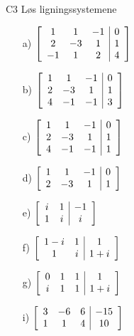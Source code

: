 \documentclass[a4paper,norsk,11pt]{interaktiv}
\newenvironment{amatrix}[1]{%
  \left[\begin{array}{*{#1}{c}|c}
}{%
  \end{array}\right]
}
\begin{document}
\begin{oppgave}{C3}
Løs ligningssystemene

\begin{itemize}
\item[a)]
$
\begin{amatrix}{3}
1 & 1 & -1 & 0 \\
  2 &- 3 & 1 & 1  \\
 -1 &  1 & 2 &  4
\end{amatrix}
$
\item[b)]
$
\begin{amatrix}{3}
  1 & 1 & -1 & 0 \\
 2 & - 3 & 1 & 1\\
 4 & -1 & -1 & 3
\end{amatrix}
$
\item[c)]
$
\begin{amatrix}{3}
		1 & 1 & -1 &  0 \\
		2 &- 3 & 1 & 1 \\
		4 &- 1 &- 1 & 1
\end{amatrix}
$
\item[d)]
$
\begin{amatrix}{3}
	1 & 1 &-  1 & 0 \\
		2 & - 3 &1&  1 
\end{amatrix}
$
\item[e)]
$
\begin{amatrix}{2}
i  & 1   & -1 \\
 1 &i  & i
\end{amatrix}
$
\item[f)]
$
\begin{amatrix}{2}
1-i  & 1   & 1 \\
 1 &i & 1+i
\end{amatrix}
$
\item[g)]
$
\begin{amatrix}{3}
0 & 1  & 1 & 1 \\
i & 1 & 1 & 1+i
\end{amatrix}
$
\item[i)]
$
\begin{amatrix}{3}
3 & -6  & 6 & -15 \\
1 & 1 & 4 & 10
\end{amatrix}
$
\end{itemize}

\end{oppgave}
\end{document}
